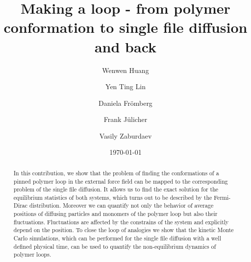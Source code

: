\documentclass[preprint, aps, superscriptaddress]{revtex4-1}
\begin{document}
\title{Making a loop - from polymer conformation to single file diffusion and back}

\author{Wenwen Huang}
\author{Yen Ting Lin}
\author{Daniela Fr\"{o}mberg}
\author{Frank J\"{u}licher}
\author{Vasily Zaburdaev}

\date{\today}

\begin{abstract}
In this contribution, we show that the problem of finding the conformations of a
pinned polymer loop in the external force field can be mapped to the
corresponding problem of the single file diffusion. It allows us to find the
exact solution for the equilibrium statistics of both systems, which turns out
to be described by the Fermi-Dirac distribution. Moreover we can quantify not
only the behavior of average positions of diffusing particles and monomers of
the polymer loop but also their fluctuations. Fluctuations are affected by the
constrains of the system and explicitly depend on the position. To close the
loop of analogies we show that the kinetic Monte Carlo simulations, which can be
performed for the single file diffusion with a well defined physical time, can
be used to quantify the non-equilibrium dynamics of polymer loops.


\end{abstract}
\maketitle
\end{document}
